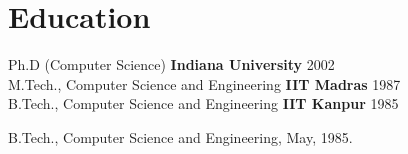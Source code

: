 \section{\sc Education}
Ph.D (Computer Science) {\bf Indiana University} 2002\\
M.Tech., Computer Science and Engineering {\bf IIT Madras}
1987\\
B.Tech., Computer Science and Engineering {\bf IIT Kanpur} 1985\\
\vspace*{-.1in}
\begin{list1}
\item[] B.Tech., Computer Science and Engineering,  May, 1985. %
\end{list1}

